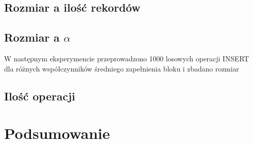 \documentclass{article}
\begin{document}
\subsection{Rozmiar a ilość rekordów}
\subsection{Rozmiar a $\alpha$}
W następnym eksperymencie przeprowadzono 1000 losowych operacji INSERT dla różnych współczynników średniego zapełnienia bloku i zbadano rozmiar 
\subsection{Ilość operacji}
\section{Podsumowanie}
\end{document}
